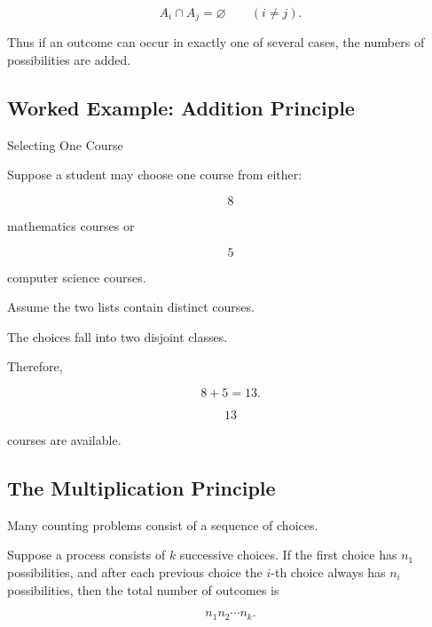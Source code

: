 \[
A_i\cap A_j=\varnothing
\qquad
(i\neq j).
\]

Thus if an outcome can occur in exactly one of several cases, the
numbers of possibilities are added.

\subsection{Worked Example: Addition Principle}
\label{subsec:worked-addition-principle}

\begin{workedexamplebox}{Selecting One Course}

Suppose a student may choose one course from either:

\[
8
\]

mathematics courses or

\[
5
\]

computer science courses.

Assume the two lists contain distinct courses.

The choices fall into two disjoint classes.

Therefore,

\[
8+5=13.
\]

\begin{answerbox}
\[
\boxed{13}
\]

courses are available.
\end{answerbox}

\end{workedexamplebox}

\subsection{The Multiplication Principle}
\label{subsec:multiplication-principle}

Many counting problems consist of a sequence of choices.

\begin{theorem}
Suppose a process consists of \(k\) successive choices. If the first
choice has \(n_1\) possibilities, and after each previous choice the
\(i\)-th choice always has \(n_i\) possibilities, then the total number
of outcomes is

\[
\boxed{
n_1n_2\cdots n_k.
}
\]
\end{theorem}

